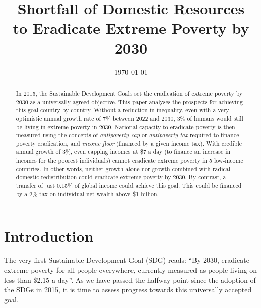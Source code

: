 \documentclass[12pt,english]{article}
\title{Shortfall of Domestic Resources\\ to Eradicate Extreme Poverty by 2030}
\date{\today} %
\makeatletter
\renewcommand\tableofcontents{%
    \@starttoc{toc}%
}
\makeatother
\begin{document}
\sloppy
\maketitle
\begin{abstract}
In 2015, the Sustainable Development Goals set the eradication of extreme poverty by 2030 as a universally agreed objective. This paper analyses the prospects for achieving this goal country by country. Without a reduction in inequality, even with a very optimistic annual growth rate of 7\% between 2022 and 2030, 3\% of humans would still be living in extreme poverty in 2030. National capacity to eradicate poverty is then measured using the concepts of \textit{antipoverty cap} or \textit{antipoverty tax} required to finance poverty eradication, and \textit{income floor} (financed by a given income tax). With credible annual growth of 3\%, even capping incomes at \$7 a day (to finance an increase in incomes for the poorest individuals) cannot eradicate extreme poverty in 5 low-income countries. In other words, neither growth alone nor growth combined with radical domestic redistribution could eradicate extreme poverty by 2030. By contrast, a transfer of just 0.15\% of global income could achieve this goal. This could be financed by a 2\% tax on individual net wealth above \$1 billion.

\end{abstract}
\clearpage
\tableofcontents

\section{Introduction}%

The very first Sustainable Development Goal (SDG) %
reads: ``By 2030, eradicate extreme poverty for all people everywhere, currently measured as people living on less than \$2.15 a day''. As we have passed the halfway point since the adoption of the SDGs in 2015, it is time to assess progress towards this universally accepted goal. 
\end{document}
